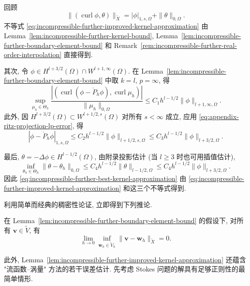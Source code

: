 \begin{Proof}
回顾
\[
\|(\operatorname{curl}\phi,\theta)\|_{\widetilde X}
=|\phi|_{1,s,\Omega}+\|\theta\|_{0,\Omega}.
\]
不等式
\eqref{eq:incompressible-further-improved-kernel-approximation}
由 Lemma~\ref{lem:incompressible-further-kernel-bound},
Lemma~\ref{lem:incompressible-further-boundary-element-bound}
和 Remark~\ref{rem:incompressible-further-real-order-interpolation}
直接得到.

其次, 令
$\phi\in H^{l+3/2}(\Omega)\cap W^{l+1,\infty}(\Omega)$.
在 Lemma~\ref{lem:incompressible-further-boundary-element-bound}
中取 $k=l$, $p=\infty$, 得
\[
\sup_{\mu_h\in\Theta_h}
\frac{|(\operatorname{curl}(\phi-\mathring P_h\phi),
\operatorname{curl}\mu_h)|}{\|\mu_h\|_{0,\Omega}}
\leq C_1h^{l-1/2}\|\phi\|_{l+1,\infty,\Omega}.
\]
此外, 因
$H^{l+3/2}(\Omega)\subset W^{l+1/2,s}(\Omega)$
对所有 $s<\infty$ 成立, 应用
\eqref{eq:appendix-ritz-projection-lp-error}, 得
\[
|\phi-\mathring P_h\phi|_{1,s,\Omega}
\leq C_2h^{l-1/2}\|\phi\|_{l+1/2,s,\Omega}
\leq C_3h^{l-1/2}\|\phi\|_{l+3/2,\Omega}.
\]

最后, $\theta=-\Delta\phi\in H^{l-1/2}(\Omega)$,
由附录投影估计 (当 $l\geq3$ 时也可用插值估计),
\[
\inf_{\theta_h\in\Theta_h}\|\theta-\theta_h\|_{0,\Omega}
\leq C_4h^{l-1/2}\|\theta\|_{l-1/2,\Omega}
\leq C_4h^{l-1/2}\|\phi\|_{l+3/2,\Omega}.
\]
因此 \eqref{eq:incompressible-further-best-kernel-approximation}
由 \eqref{eq:incompressible-further-improved-kernel-approximation}
和这三个不等式得到.
\end{Proof}

利用简单而经典的稠密性论证, 立即得到下列推论.

\begin{Corollary}\label{cor:incompressible-further-kernel-density}
在 Lemma~\ref{lem:incompressible-further-boundary-element-bound}
的假设下, 对所有 $\mathbf v\in\widetilde V$, 有
\[
\lim_{h\to0}\inf_{\mathbf w_h\in\widetilde V_h}
\|\mathbf v-\mathbf w_h\|_{\widetilde X}=0.
\]
\end{Corollary}

此外, Lemma~\ref{lem:incompressible-further-improved-kernel-approximation}
还蕴含 "流函数--涡量" 方法的若干误差估计.
先考虑 Stokes 问题的解具有足够正则性的最简单情形.

